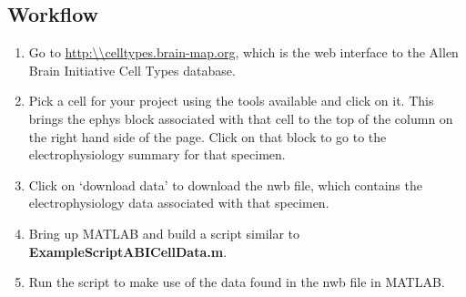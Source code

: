 \documentclass{article}
\begin{document}
\subsection{Workflow}
\begin{enumerate}
	\item Go to \url{http:\\celltypes.brain-map.org}, which is the web interface to the Allen Brain Initiative Cell Types database.
	\item Pick a cell for your project using the tools available and click on it.  This brings the ephys block associated with that cell to the top of the column on the right hand side of the page.  Click on that block to go to the electrophysiology summary for that specimen.
	\item Click on `download data' to download the nwb file, which contains the electrophysiology data associated with that specimen.
	\item Bring up MATLAB and build a script similar to \textbf{ExampleScriptABICellData.m}.
	\item Run the script to make use of the data found in the nwb file in MATLAB.
\end{enumerate}
\end{document}
